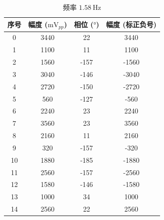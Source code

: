 \documentclass{customDoc}
\begin{document}
\hspace{-60pt}
\parbox{0.6\textwidth}{
\begin{longtable}{|c|c|c|c|}
  \caption{频率 $\SI{1.58}{\hertz}$} \\
    \hline
    序号    & 幅度 ($\si{\milli\volt}_{pp}$) & 相位 ($\si{\degree}$) & 幅度 (标正负号) \\
    \hline
    0     & 3440  & 22    & 3440 \\
    \hline
    1     & 1100  & 11    & 1100 \\
    \hline
    2     & 1560  & -157  & -1560 \\
    \hline
    3     & 3040  & -146  & -3040 \\
    \hline
    4     & 2720  & -150  & -2720 \\
    \hline
    5     & 560   & -127  & -560 \\
    \hline
    6     & 2240  & 23    & 2240 \\
    \hline
    7     & 3560  & 23    & 3560 \\
    \hline
    8     & 2160  & 11    & 2160 \\
    \hline
    9     & 320   & -157  & -320 \\
    \hline
    10    & 1880  & -185  & -1880 \\
    \hline
    11    & 2560  & -157  & -2560 \\
    \hline
    12    & 1580  & -146  & -1580 \\
    \hline
    13    & 1000  & 34    & 1000 \\
    \hline
    14    & 2560  & 22    & 2560 \\
    \hline
\end{longtable}
}
\end{document}
